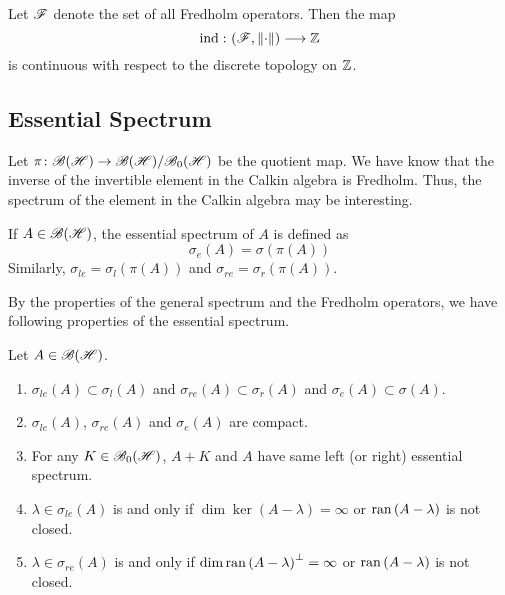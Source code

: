 \documentclass[a4paper,11pt]{report}
\begin{document}
\begin{cor}
	Let $\mathscr{F}$ denote the set of all Fredholm operators. Then the map
	\begin{equation*}
		\operatorname{ind}{} \colon (\mathscr{F},\left\lVert\cdot\right\lVert) \longrightarrow \mathbb{Z}
	\end{equation*}
	is continuous with respect to the discrete topology on $\mathbb{Z}$. 
\end{cor}

\subsection{Essential Spectrum}

Let $\pi \colon \mathscr{B(H)} \rightarrow \mathscr{B(H)} / \mathscr{B}_{0}\mathscr{(H)}$ be the quotient map. We have know that the inverse of the invertible element in the Calkin algebra is Fredholm. Thus, the spectrum of the element in the Calkin algebra may be interesting.

\begin{defn}
	If $A \in \mathscr{B(H)}$, the essential spectrum of $A$ is defined as
	\begin{equation*}
		\sigma_e(A) = \sigma(\pi(A))
	\end{equation*}
	Similarly, $\sigma_{le} = \sigma_l(\pi(A))$ and $\sigma_{re} = \sigma_r(\pi(A))$.
\end{defn}

By the properties of the general spectrum and the Fredholm operators, we have following properties of the essential spectrum.

\begin{prop}
	Let $A \in \mathscr{B(H)}$.
	\begin{enumerate}[label = \arabic*)]
		\item $\sigma_{le}(A) \subset \sigma_l(A)$ and $\sigma_{re}(A) \subset \sigma_r(A)$ and $\sigma_e(A) \subset \sigma(A)$.
		\item $\sigma_{le}(A)$, $\sigma_{re}(A)$ and $\sigma_e(A)$ are compact.
		\item For any $K \in \mathscr{B}_{0}\mathscr{(H)}$, $A+K$ and $A$ have same left (or right) essential spectrum.
		\item $\lambda \in \sigma_{le}(A)$ is and only if $\dim{\ker{(A-\lambda)}} = \infty$ or $\operatorname{ran}{(A-\lambda)}$ is not closed.
		\item $\lambda \in \sigma_{re}(A)$ is and only if $\dim{\operatorname{ran}{(A-\lambda)}^{\bot}} = \infty$ or $\operatorname{ran}{(A-\lambda)}$ is not closed.
	\end{enumerate}
\end{prop}
\end{document}

